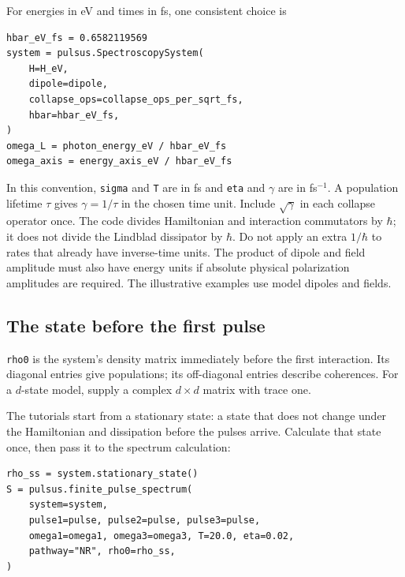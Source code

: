 For energies in eV and times in fs, one consistent choice is
\par\noindent
\begin{minipage}{\linewidth}
\begin{lstlisting}[style=python]
hbar_eV_fs = 0.6582119569
system = pulsus.SpectroscopySystem(
    H=H_eV,
    dipole=dipole,
    collapse_ops=collapse_ops_per_sqrt_fs,
    hbar=hbar_eV_fs,
)
omega_L = photon_energy_eV / hbar_eV_fs
omega_axis = energy_axis_eV / hbar_eV_fs
\end{lstlisting}
\end{minipage}\par
In this convention, \texttt{sigma} and \texttt{T} are in fs and
\texttt{eta} and $\gamma$ are in fs$^{-1}$. A population lifetime
$\tau$ gives $\gamma=1/\tau$ in the chosen time unit. Include
$\sqrt\gamma$ in each collapse operator once. The code divides Hamiltonian
and interaction commutators by $\hbar$; it does not divide the Lindblad
dissipator by $\hbar$. Do not apply an extra $1/\hbar$ to rates that already
have inverse-time units. The product of dipole and field amplitude must
also have energy units if absolute physical polarization amplitudes are
required. The illustrative examples use model dipoles and fields.

\subsection{The state before the first pulse}

\texttt{rho0} is the system's density matrix immediately before the first
interaction. Its diagonal entries give populations; its off-diagonal
entries describe coherences. For a $d$-state model, supply a complex
$d\times d$ matrix with trace one.

The tutorials start from a stationary state: a state that does not change
under the Hamiltonian and dissipation before the pulses arrive. Calculate
that state once, then pass it to the spectrum calculation:
\par\noindent
\begin{minipage}{\linewidth}
\begin{lstlisting}[style=python]
rho_ss = system.stationary_state()
S = pulsus.finite_pulse_spectrum(
    system=system,
    pulse1=pulse, pulse2=pulse, pulse3=pulse,
    omega1=omega1, omega3=omega3, T=20.0, eta=0.02,
    pathway="NR", rho0=rho_ss,
)
\end{lstlisting}
\end{minipage}\par

